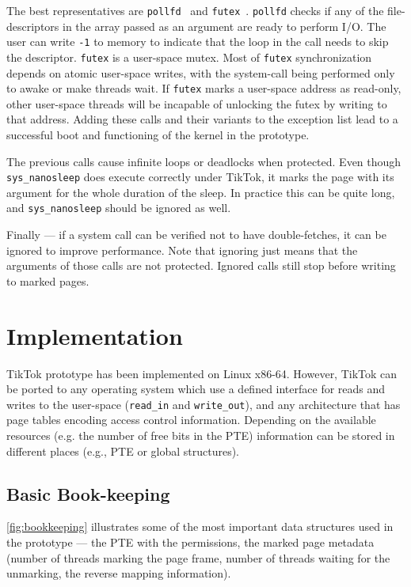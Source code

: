 \documentclass[conference]{IEEEtran}
\newcommand{\sysname}{TikTok}
\begin{document}
The best representatives are \texttt{pollfd}~\cite{pollfd} and
\texttt{futex}~\cite{futex}. \texttt{pollfd} checks if any of the
file-descriptors in the array passed as an argument are ready to perform I/O.
The user can write \texttt{-1} to memory to indicate that the loop in the call
needs to skip the descriptor. \texttt{futex} is a user-space mutex. Most of
\texttt{futex} synchronization depends on atomic user-space writes, with the
system-call being performed only to awake or make threads wait. If
\texttt{futex} marks a user-space address as read-only, other user-space threads
will be incapable of unlocking the futex by writing to that address. Adding
these calls and their variants to the exception list lead to a successful boot
and functioning of the kernel in the prototype.

The previous calls cause infinite loops or deadlocks when protected. Even though
\texttt{sys\_nanosleep} does execute correctly under \sysname, it marks the page
with its argument for the whole duration of the sleep. In practice this can be
quite long, and \texttt{sys\_nanosleep} should be ignored as well.

Finally --- if a system call can be verified not to have double-fetches, it can
be ignored to improve performance. Note that ignoring just means that the
arguments of those calls are not protected. Ignored calls still stop before
writing to marked pages.


\section{Implementation}
\label{sec:implementation}

\sysname{} prototype has been implemented on Linux x86-64. However, TikTok can be
ported to any operating system which use a defined interface for reads and
writes to the user-space (\texttt{read\_in} and \texttt{write\_out}), and any
architecture that has page tables encoding access control information. Depending
on the available resources (e.g. the number of free bits in the PTE) information
can be stored in different places (e.g., PTE or global structures).

\subsection{Basic Book-keeping}
\autoref{fig:bookkeeping} illustrates some of the most important data structures
used in the prototype --- the PTE with the permissions, the marked page metadata
(number of threads marking the page frame, number of threads waiting for the
unmarking, the reverse mapping information). 
\end{document}
